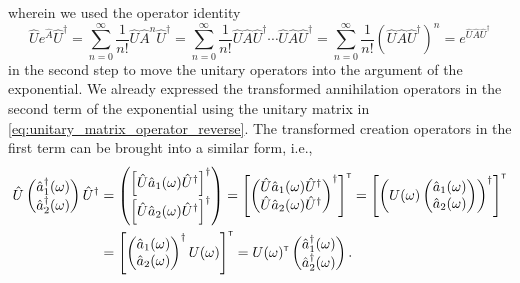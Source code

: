 wherein we used the operator identity
\begin{equation}
	\hat{U}
	e^{\hat{A}}
	\hat{U}^\dagger
	=
	\sum_{n=0}^\infty
	\frac{1}{n!}
	\hat{U}
	\hat{A}^n
	\hat{U}^\dagger
	=
	\sum_{n=0}^\infty
	\frac{1}{n!}
	\hat{U}
	\hat{A}
	\hat{U}^\dagger
	\cdots
	\hat{U}
	\hat{A}
	\hat{U}^\dagger
	=
	\sum_{n=0}^\infty
	\frac{1}{n!}
	\left(
		\hat{U}
		\hat{A}
		\hat{U}^\dagger
	\right)^n
	=
	e^{\hat{U}\hat{A}\hat{U}^\dagger}
\end{equation}
in the second step to move the unitary operators into the argument of the exponential.
We already expressed the transformed annihilation operators in the second term of the exponential using the unitary matrix in \cref{eq:unitary_matrix_operator_reverse}.
The transformed creation operators in the first term can be brought into a similar form, i.e.,
\begin{equation}
	\begin{split}
		\hat{U}
		\begin{pmatrix}
			\hat{a}_1^\dagger(\omega) \\
			\hat{a}_2^\dagger(\omega)
		\end{pmatrix}
		\hat{U}^\dagger
		&=
		\begin{pmatrix}
			\left[
				\hat{U}
				\hat{a}_1(\omega)
				\hat{U}^\dagger
			\right]^\dagger \\
			\left[
				\hat{U}
				\hat{a}_2(\omega)
				\hat{U}^\dagger
			\right]^\dagger
		\end{pmatrix}
		=
		\left[
			\begin{pmatrix}
				\hat{U}
				\hat{a}_1(\omega)
				\hat{U}^\dagger
				\\
				\hat{U}
				\hat{a}_2(\omega)
				\hat{U}^\dagger
			\end{pmatrix}^\dagger
		\right]^{\scriptscriptstyle\mathsf{T}}
		=
		\left[
			\left(
				U(\omega)
				\begin{pmatrix}
					\hat{a}_1(\omega) \\
					\hat{a}_2(\omega)
				\end{pmatrix}
			\right)^\dagger
		\right]^{\scriptscriptstyle\mathsf{T}}		
		\\
		&=
		\left[
			\begin{pmatrix}
				\hat{a}_1(\omega)
				\\
				\hat{a}_2(\omega)
			\end{pmatrix}^\dagger
			U(\omega)
		\right]^{\scriptscriptstyle\mathsf{T}}
		=
		U(\omega)^{\scriptscriptstyle\mathsf{T}}
		\begin{pmatrix}
			\hat{a}_1^\dagger(\omega) \\
			\hat{a}_2^\dagger(\omega)
		\end{pmatrix}
		.
	\end{split}
\end{equation}
